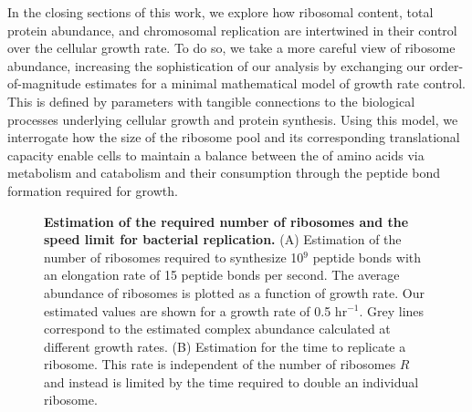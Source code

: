 In the closing sections of this work, we explore how ribosomal content, total
protein abundance, and chromosomal replication are intertwined in their control
over the cellular growth rate. To do so, we take a more careful view of ribosome
abundance, increasing the sophistication of our analysis by exchanging our order-of-magnitude estimates for a minimal
mathematical model of growth rate control. This is defined by parameters with
tangible connections to the biological processes underlying cellular growth and
protein synthesis. Using this model, we interrogate how the size of the ribosome
pool and its corresponding translational capacity enable cells to maintain a
balance  between the of amino acids via metabolism and catabolism and their
consumption through the peptide bond formation required for growth.

\begin{figure}
        \caption{\textbf{Estimation of the required number of ribosomes and the
        speed limit for bacterial replication.} (A) Estimation of the
        number of ribosomes required to synthesize 10$^9$ peptide bonds with an
        elongation rate of 15 peptide bonds per second. The
        average abundance of ribosomes is plotted as a function of growth rate.
        Our estimated values are shown for a growth rate of 0.5 hr$^{-1}$.
        Grey lines correspond to the estimated complex abundance calculated at
        different growth rates. (B) Estimation for the time to replicate a
        ribosome. This rate is independent of the number of ribosomes $R$ and instead is limited by the time required to
        double an individual ribosome.} \label{fig:protein_synthesis}


\end{figure}
